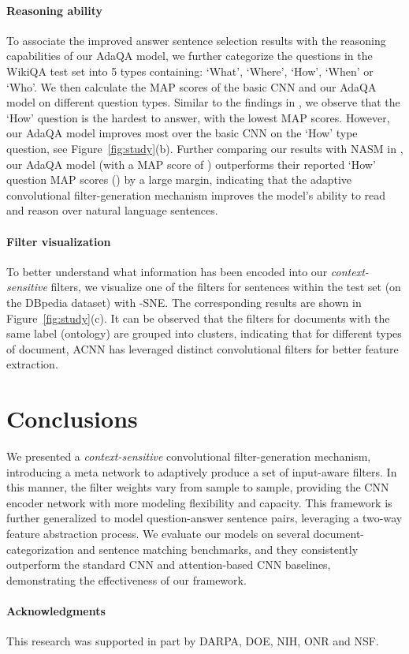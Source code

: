 \documentclass[11pt,a4paper]{article}
\begin{document}
\paragraph{Reasoning ability}
To associate the improved answer sentence selection results with the reasoning capabilities of our AdaQA model, we further categorize the questions in the WikiQA test set into 5 types containing: `What', `Where', `How', `When' or `Who'. We then calculate the MAP scores of the basic CNN and our AdaQA model on different question types. Similar to the findings in \cite{miao2016neural}, we observe that the `How' question is the hardest to answer, with the lowest MAP scores. However, our AdaQA model improves most over the basic CNN on the `How' type question, see Figure~\ref{fig:study}(b). Further comparing our results with NASM in \cite{miao2016neural}, our AdaQA model (with a MAP score of ) outperforms their reported `How' question MAP scores () by a large margin, indicating that the adaptive convolutional filter-generation mechanism improves the model's ability to read and reason over natural language sentences.
\vspace{-2mm}
\paragraph{Filter visualization}
To better understand what information has been encoded into our \emph{context-sensitive} filters, we visualize one of the filters for sentences within the test set  (on the DBpedia dataset) with -SNE. The corresponding results are shown in Figure~\ref{fig:study}(c). It can be observed that the filters for documents with the same label (ontology) are grouped into clusters, indicating that for different types of document, ACNN has leveraged distinct convolutional filters for  better feature extraction.
\vspace{-1mm}
\section{Conclusions}
\vspace{-2mm}
We presented a \emph{context-sensitive} convolutional filter-generation mechanism, introducing a meta network to adaptively produce a set of input-aware filters. In this manner, the filter weights vary from sample to sample, providing the CNN encoder network with more modeling flexibility and capacity. This framework is further generalized to model question-answer sentence pairs, leveraging a two-way feature abstraction process. We evaluate our models on several document-categorization and sentence matching benchmarks, and they consistently outperform the standard CNN and attention-based CNN baselines, demonstrating the effectiveness of our framework.

\paragraph{Acknowledgments}
This research was supported in part by DARPA, DOE, NIH, ONR and NSF.




\appendix
\end{document}
